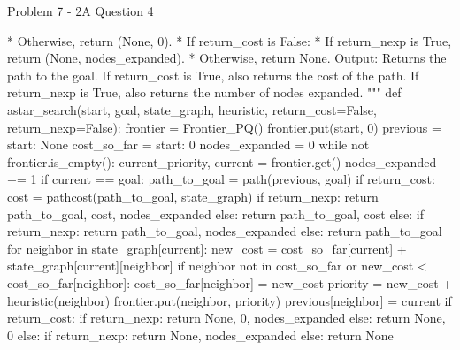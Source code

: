 \begin{problem}{Problem 7 - 2A Question 4}
\begin{highlight}[Solution]
\begin{code}[Python]
                    * Otherwise, return (None, 0).
                * If return_cost is False:
                    * If return_nexp is True, return (None, nodes_expanded).
                    * Otherwise, return None.
        Output:
            Returns the path to the goal.
            If return_cost is True, also returns the cost of the path.
            If return_nexp is True, also returns the number of nodes expanded.
    """
    def astar_search(start, goal, state_graph, heuristic, return_cost=False, return_nexp=False):
        frontier = Frontier_PQ()
        frontier.put(start, 0)
        previous = {start: None}
        cost_so_far = {start: 0}
        nodes_expanded = 0
        while not frontier.is_empty():
            current_priority, current = frontier.get()
            nodes_expanded += 1
            if current == goal:
                path_to_goal = path(previous, goal)
                if return_cost:
                    cost = pathcost(path_to_goal, state_graph)
                    if return_nexp:
                        return path_to_goal, cost, nodes_expanded
                    else:
                        return path_to_goal, cost
                else:
                    if return_nexp:
                        return path_to_goal, nodes_expanded
                    else:
                        return path_to_goal
            for neighbor in state_graph[current]:
                new_cost = cost_so_far[current] + state_graph[current][neighbor]
                if neighbor not in cost_so_far or new_cost < cost_so_far[neighbor]:
                    cost_so_far[neighbor] = new_cost
                    priority = new_cost + heuristic(neighbor)
                    frontier.put(neighbor, priority)
                    previous[neighbor] = current
        if return_cost:
            if return_nexp:
                return None, 0, nodes_expanded
            else:
                return None, 0
        else:
            if return_nexp:
                return None, nodes_expanded
            else:
                return None
    

\end{code}
\end{highlight}
\end{problem}
